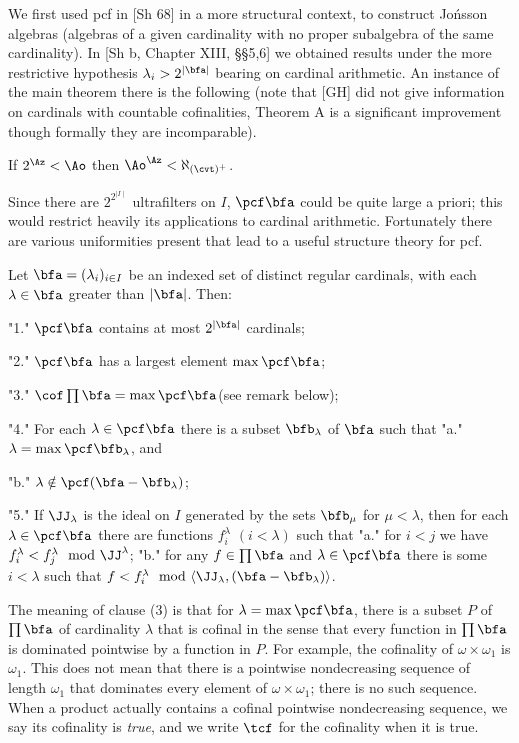 We first used pcf in [Sh 68] in a more
structural context, to
construct Jo\'nsson algebras (algebras of a
given cardinality with no
proper subalgebra of the same cardinality).
In [Sh b, Chapter XIII,
\S\S5,6] we obtained results under the
more restrictive hypothesis $\lambda_i>2^{\mid \bfa\mid }$ 
bearing on cardinal
arithmetic. An instance of the main theorem there is the 
following
(note that [GH] did not give information on cardinals with 
countable
cofinalities, Theorem A is a significant improvement 
though formally
they are incomparable).
 
 If $2^\Az<\Ao$ then 
$\Ao^\Az<\aleph_{(\cvt)^+}$.
\endproclaim
 
Since there are $2^{2^{\mid I\mid }}$ ultrafilters on $I$, 
$\pcf \bfa$ could
be quite large a priori; this would restrict heavily its
applications to cardinal arithmetic.  Fortunately there 
are various
uniformities present that lead to a useful structure 
theory for pcf.
 
Let $\bfa=(\lambda_i)_{i\in I}$ be an indexed set of
 distinct regular cardinals, with
each $\lambda\in \bfa$ greater than $|\bfa|$. Then\RM:
\roster
\item"1." $\pcf \bfa$ contains at most $2^{\mid \bfa\mid 
}$ cardinals\RM;
\item"2." $\pcf \bfa$ has a largest element $\max \pcf 
\bfa$\RM;
\item"3." $\cof\prod\bfa=\max\pcf\bfa${\rm (}see remark 
below\RM)\RM;
\item"4." For each $\lambda\in \pcf \bfa$ there is a subset
$\bfb_\lambda$ of $\bfa$ such that
\itemitem"a." $\lambda = \max\pcf \bfb_\lambda$, and
 
\itemitem"b." $\lambda\notin \pcf (\bfa-\bfb_\lambda)$\RM;
\item"5." If $\JJ_\lambda$ is the ideal on $I$ generated 
by the sets
$\bfb_\mu$ for $\mu<\lambda$, then
for each $\lambda\in \pcf \bfa$ there are functions 
$f^{\lambda}_i$
$(i<\lambda)$ such that
\itemitem"a." for $i<j$ we have $f^\lambda_i <
      f^\lambda_j \mod \JJ^\lambda$\RM;
\itemitem"b." for any $f\in \prod\bfa$ and 
$\lambda\in\pcf\bfa$ there
is some $i<\lambda$ such that $f<f^\lambda_i \mod
\langle\JJ_\lambda,(\bfa-\bfb_\lambda)\rangle$.
\endroster

\endproclaim
 
The meaning of clause (3) is that for 
$\lambda=\max\pcf\bfa$, there
is a subset $P$ of $\prod\bfa$ of cardinality $\lambda$ 
that is cofinal
in the sense that every function in $\prod \bfa$ is 
dominated
pointwise by a function in $P$.  For example, the 
cofinality of
$\omega\times\omega_1$ is $\omega_1$. This does not  mean 
that
there is a pointwise nondecreasing sequence of length 
$\omega_1$ that
dominates every element of $\omega\times\omega_1$; there 
is no such
sequence. When a product actually contains a cofinal 
pointwise
nondecreasing sequence, we say its cofinality is {\it 
true\/}, and we
write  $\tcf$ for the cofinality when it is true.
\endrem

